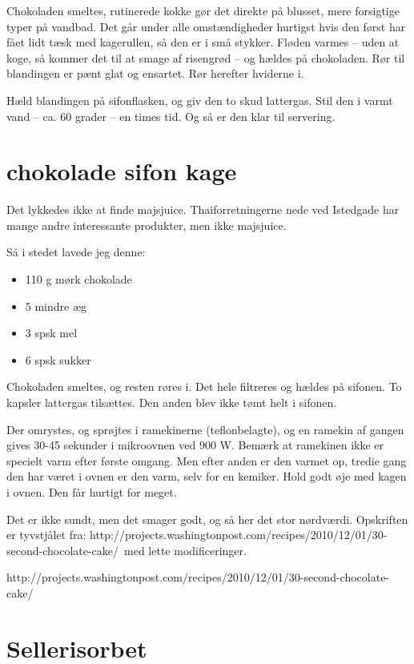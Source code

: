 \documentclass[
  letterpaper,
  DIV=11,
  numbers=noendperiod]{scrreprt}
\providecommand{\tightlist}{%
  \setlength{\itemsep}{0pt}\setlength{\parskip}{0pt}}\usepackage{longtable,booktabs,array}
\begin{document}
Chokoladen smeltes, rutinerede kokke gør det direkte på blusset, mere
forsigtige typer på vandbad. Det går under alle omstændigheder hurtigst
hvis den først har fået lidt tæsk med kagerullen, så den er i små
stykker. Fløden varmes -- uden at koge, så kommer det til at smage af
risengrød -- og hældes på chokoladen. Rør til blandingen er pænt glat og
ensartet. Rør herefter hviderne i.

Hæld blandingen på sifonflasken, og giv den to skud lattergas. Stil den
i varmt vand -- ca. 60 grader -- en times tid. Og så er den klar til
servering.

\hypertarget{chokolade-sifon-kage}{%
\section{chokolade sifon kage}\label{chokolade-sifon-kage}}

Det lykkedes ikke at finde majsjuice. Thaiforretningerne nede ved
Istedgade har mange andre interessante produkter, men ikke majsjuice.

Så i stedet lavede jeg denne:

\begin{itemize}
\tightlist
\item
  110 g mørk chokolade
\item
  5 mindre æg
\item
  3 spsk mel
\item
  6 spsk sukker
\end{itemize}

Chokoladen smeltes, og resten røres i. Det hele filtreres og hældes på
sifonen. To kapsler lattergas tilsættes. Den anden blev ikke tømt helt i
sifonen.

Der omrystes, og sprøjtes i ramekinerne (teflonbelagte), og en ramekin
af gangen gives 30-45 sekunder i mikroovnen ved 900 W. Bemærk at
ramekinen ikke er specielt varm efter første omgang. Men efter anden er
den varmet op, tredie gang den har været i ovnen er den varm, selv for
en kemiker. Hold godt øje med kagen i ovnen. Den får hurtigt for meget.

Det er ikke sundt, men det smager godt, og så her det stor nørdværdi.
Opskriften er tyvstjålet fra:
http://projects.washingtonpost.com/recipes/2010/12/01/30-second-chocolate-cake/~med
lette modificeringer.

http://projects.washingtonpost.com/recipes/2010/12/01/30-second-chocolate-cake/

\hypertarget{sellerisorbet}{%
\section{Sellerisorbet}\label{sellerisorbet}}
\end{document}
